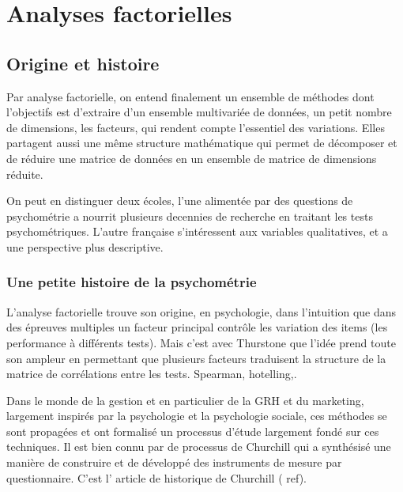 \documentclass[
]{book}
\begin{document}
\hypertarget{analyses-factorielles}{%
\chapter{Analyses factorielles}\label{analyses-factorielles}}

\hypertarget{origine-et-histoire}{%
\section{Origine et histoire}\label{origine-et-histoire}}

Par analyse factorielle, on entend finalement un ensemble de méthodes dont l'objectifs est d'extraire d'un ensemble multivariée de données, un petit nombre de dimensions, les facteurs, qui rendent compte l'essentiel des variations. Elles partagent aussi une même structure mathématique qui permet de décomposer et de réduire une matrice de données en un ensemble de matrice de dimensions réduite.

On peut en distinguer deux écoles, l'une alimentée par des questions de psychométrie a nourrit plusieurs decennies de recherche en traitant les tests psychométriques. L'autre française s'intéressent aux variables qualitatives, et a une perspective plus descriptive.

\hypertarget{une-petite-histoire-de-la-psychomuxe9trie}{%
\subsection{Une petite histoire de la psychométrie}\label{une-petite-histoire-de-la-psychomuxe9trie}}

L'analyse factorielle trouve son origine, en psychologie, dans l'intuition que dans des épreuves multiples un facteur principal contrôle les variation des items (les performance à différents tests). Mais c'est avec Thurstone que l'idée prend toute son ampleur en permettant que plusieurs facteurs traduisent la structure de la matrice de corrélations entre les tests. Spearman, hotelling,.

Dans le monde de la gestion et en particulier de la GRH et du marketing, largement inspirés par la psychologie et la psychologie sociale, ces méthodes se sont propagées et ont formalisé un processus d'étude largement fondé sur ces techniques. Il est bien connu par de processus de Churchill qui a synthésisé une manière de construire et de développé des instruments de mesure par questionnaire. C'est l' article de historique de Churchill ( ref).
\end{document}
